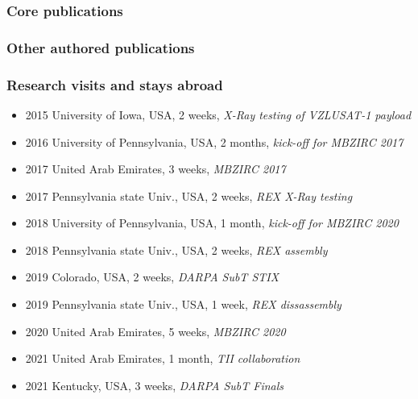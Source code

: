 \documentclass[aspectratio=169]{beamer}
\begin{document}


\DeclareCiteCommand{\fullcite}
{}
{%
  \usedriver
  {%
  }
{}}
{\multicitedelim}
{}

\begin{frame}
  \frametitle{Core publications}
  \tiny{
    \printbibliography[keyword={mine},keyword={phd_related},keyword={core},heading=none,title={}]
  }
\end{frame}

\begin{frame}[allowframebreaks]
  \frametitle{Other authored publications}
  \tiny{
    \printbibliography[keyword={mine},notkeyword={core},heading=none,title={}]
  }
\end{frame}




\begin{frame}[noframenumbering]
\frametitle{Research visits and stays abroad}

  \begin{itemize}
    \item 2015 University of Iowa, USA, 2 weeks, \emph{X-Ray testing of VZLUSAT-1 payload}
    \item 2016 University of Pennsylvania, USA, 2 months, \emph{kick-off for MBZIRC 2017}
    \item 2017 United Arab Emirates, 3 weeks, \emph{MBZIRC 2017}
    \item 2017 Pennsylvania state Univ., USA, 2 weeks, \emph{REX X-Ray testing}
    \item 2018 University of Pennsylvania, USA, 1 month, \emph{kick-off for MBZIRC 2020}
    \item 2018 Pennsylvania state Univ., USA, 2 weeks, \emph{REX assembly}
    \item 2019 Colorado, USA, 2 weeks, \emph{DARPA SubT STIX}
    \item 2019 Pennsylvania state Univ., USA, 1 week, \emph{REX dissassembly}
    \item 2020 United Arab Emirates, 5 weeks, \emph{MBZIRC 2020}
    \item 2021 United Arab Emirates, 1 month, \emph{TII collaboration}
    \item 2021 Kentucky, USA, 3 weeks, \emph{DARPA SubT Finals}
  \end{itemize}

\end{frame}

\end{document}
